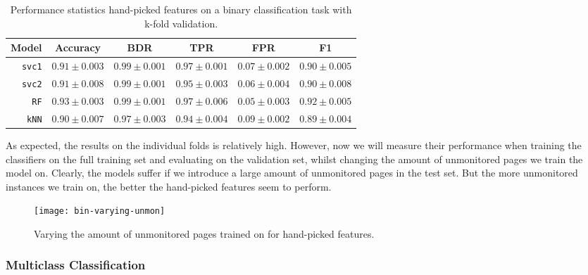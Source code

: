 \begin{table}[ht]
  \centering
  \begin{tabular}{ r  r  r  r  r  r } \hline
    \multicolumn{1}{c}{\textbf{Model}} & \multicolumn{1}{c}{\textbf{Accuracy}} & \multicolumn{1}{c}{\textbf{BDR}} & \multicolumn{1}{c}{\textbf{TPR}} &
      \multicolumn{1}{c}{\textbf{FPR}} & \multicolumn{1}{c}{\textbf{F1}} \\ \hline

    \texttt{svc1} & $0.91 \pm 0.003$ & $0.99 \pm 0.001$ & $0.97 \pm 0.001$ & $0.07 \pm 0.002$ & $0.90 \pm 0.005$ \\

    \texttt{svc2} & $0.91 \pm 0.008$ & $0.99 \pm 0.001$ & $0.95 \pm 0.003$ & $0.06 \pm 0.004$ & $0.90 \pm 0.008$ \\

    \texttt{RF} & $0.93 \pm 0.003$ & $0.99 \pm 0.001$ & $0.97 \pm 0.006$ & $0.05 \pm 0.003$ & $0.92 \pm 0.005$ \\

    \texttt{kNN} & $0.90 \pm 0.007$ & $0.97 \pm 0.003$ & $0.94 \pm 0.004$ & $0.09 \pm 0.002$ & $0.89 \pm 0.004$ \\

    \hline
  \end{tabular}
  \caption{Performance statistics hand-picked features on a binary classification task with k-fold validation.} %
  \label{table:hand-picked-bin}
\end{table}

As expected, the results on the individual folds is relatively high.
However, now we will measure their performance when training the classifiers on the full training set and evaluating on the validation set, whilst changing the amount of unmonitored pages we train the model on.
Clearly, the models suffer if we introduce a large amount of unmonitored pages in the test set.
But the more unmonitored instances we train on, the better the hand-picked features seem to perform.

\begin{figure}[ht]
  \centering
  \texttt{[image: bin-varying-unmon]}
  \caption{Varying the amount of unmonitored pages trained on for hand-picked features.}
  \label{fig:bin-varying-unmon}
\end{figure}


\subsubsection{Multiclass Classification}

